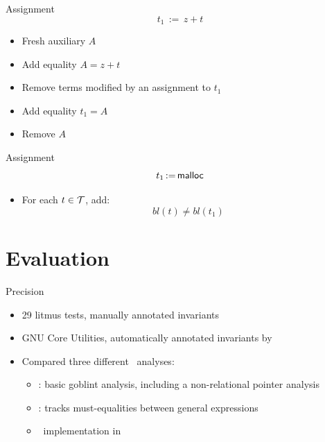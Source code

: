 \documentclass{beamer}
\begin{document}
\begin{frame}{Assignment}
    \[
        t_1\,{:=}\,z + t
    \]
    \begin{itemize}
        \item Fresh auxiliary $A$
        \item Add equality $A = z + t$
        \item Remove terms modified by an assignment to $t_1$
        \item Add equality $t_1 = A$
        \item Remove $A$
    \end{itemize}
\end{frame}

\begin{frame}{Assignment}
    \[
        t_1\,{:=}\,\textsf{malloc}
    \]
    \begin{itemize}
        \item For each $t \in \mathcal{T}$, add:
              \[
                  bl(t) \neq bl(t_1)
              \]
    \end{itemize}
\end{frame}

\section{Evaluation}
\frame{\tableofcontents[currentsection]}

\begin{frame}{Precision}
    \begin{itemize}
        \item 29 litmus tests, manually annotated invariants
        \item GNU Core Utilities, automatically annotated invariants by \cpo\
        \item Compared three different \goblint\ analyses:
              \begin{itemize}
                  \item \base{}: basic goblint analysis, including a non-relational pointer analysis
                  \item \vareq{}: tracks must-equalities between general expressions
                  \item \cpo\ implementation in \goblint\
              \end{itemize}
    \end{itemize}
\end{frame}
\end{document}
